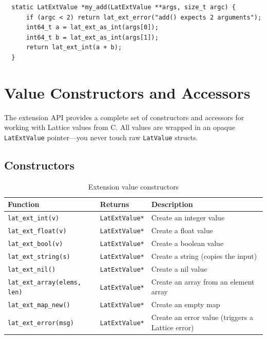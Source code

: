 \begin{verbatim}
  static LatExtValue *my_add(LatExtValue **args, size_t argc) {
      if (argc < 2) return lat_ext_error("add() expects 2 arguments");
      int64_t a = lat_ext_as_int(args[0]);
      int64_t b = lat_ext_as_int(args[1]);
      return lat_ext_int(a + b);
  }
\end{verbatim}

\section{Value Constructors and Accessors}\label{sec:ext-values}

The extension API provides a complete set of constructors and accessors for working with Lattice values from C.
All values are wrapped in an opaque \lstinline|LatExtValue| pointer---you never touch raw \lstinline|LatValue| structs.

\subsection{Constructors}

\begin{table}[h]
\centering
\caption{Extension value constructors}\label{tab:ext-constructors}
\begin{tabular}{@{} l l p{5.5cm} @{}}
\toprule
\textbf{Function} & \textbf{Returns} & \textbf{Description} \\
\midrule
\lstinline|lat_ext_int(v)| & \lstinline|LatExtValue*| & Create an integer value \\
\lstinline|lat_ext_float(v)| & \lstinline|LatExtValue*| & Create a float value \\
\lstinline|lat_ext_bool(v)| & \lstinline|LatExtValue*| & Create a boolean value \\
\lstinline|lat_ext_string(s)| & \lstinline|LatExtValue*| & Create a string (copies the input) \\
\lstinline|lat_ext_nil()| & \lstinline|LatExtValue*| & Create a nil value \\
\lstinline|lat_ext_array(elems, len)| & \lstinline|LatExtValue*| & Create an array from an element array \\
\lstinline|lat_ext_map_new()| & \lstinline|LatExtValue*| & Create an empty map \\
\lstinline|lat_ext_error(msg)| & \lstinline|LatExtValue*| & Create an error value (triggers a Lattice error) \\
\bottomrule
\end{tabular}
\end{table}

